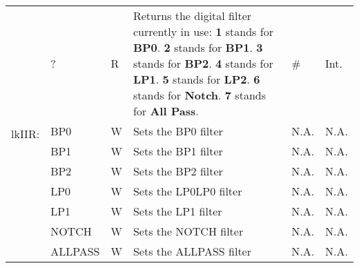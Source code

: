 \begin{center}
\begin{longtable}{| m{} | m{} | m{} | m{} | m{}| m{} |}
    \multirow{8}{0.1\textwidth}{lkIIR:}  & ? & R & Returns the digital filter currently in use:
                                            \newline \textbf{1} stands for \textbf{BP0}.
                                            \newline \textbf{2} stands for \textbf{BP1}.
                                            \newline \textbf{3} stands for \textbf{BP2}.
                                            \newline \textbf{4} stands for \textbf{LP1}.
                                            \newline \textbf{5} stands for \textbf{LP2}.
                                            \newline \textbf{6} stands for \textbf{Notch}.
                                            \newline \textbf{7} stands for \textbf{All Pass}. &  \# & Int. \\
                                        \cline{2-6}
                                        &  BP0  & W & Sets the BP0 filter & N.A. & N.A. \\
                                        \cline{2-6}
                                        &  BP1  & W & Sets the BP1 filter & N.A. & N.A. \\
                                        \cline{2-6}
                                        &  BP2  & W & Sets the BP2 filter & N.A. & N.A. \\
                                        \cline{2-6}
                                        &  LP0  & W & Sets the LP0LP0 filter & N.A. & N.A. \\
                                        \cline{2-6}
                                        &  LP1  & W & Sets the LP1 filter & N.A. & N.A. \\
                                        \cline{2-6}
                                        &  NOTCH  & W & Sets the NOTCH filter & N.A. & N.A. \\
                                        \cline{2-6}
                                        &  ALLPASS  & W & Sets the ALLPASS filter & N.A. & N.A. \\
    \hline
    
    \end{longtable}
\end{center}




